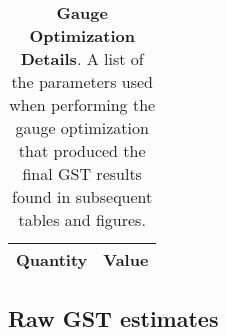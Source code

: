 \documentclass{article}[11pt]
\begin{document}
\begin{table}[h]
\begin{center}
\begin{tabular}[l]{|c|c|}
\hline
\textbf{Quantity} & \textbf{Value} \\ \hline
\end{tabular}

\caption{\textbf{Gauge Optimization Details}.  A list of the parameters used when performing the gauge optimization that produced the final GST results found in subsequent tables and figures.\label{bestGatesetGaugeParamsTable}}
\end{center}
\end{table}


\subsection{Raw GST estimates}
\end{document}
